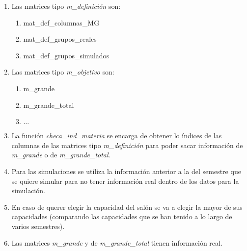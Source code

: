 \begin{enumerate}
  
  \item Las matrices tipo \textit{m\_definición} son:
  
  	\begin{enumerate}
  		\item mat\_def\_columnas\_MG
		
		\item mat\_def\_grupos\_reales
		
		\item mat\_def\_grupos\_simulados
	\end{enumerate}
  
  \item Las matrices tipo \textit{m\_objetivo} son:
  
  	\begin{enumerate}
  		\item m\_grande
		
		\item m\_grande\_total
		
		\item $\ldots$
	\end{enumerate}  
  
  
  \item La función \textit{checa\_ind\_materia} se encarga de obtener lo índices de las columnas de las matrices tipo \textit{m\_definición} para poder sacar información de \textit{m\_grande} o de \textit{m\_grande\_total}.
  
  \item Para las simulaciones se utiliza la información anterior a la del semestre que se quiere simular para no tener información real dentro  de los datos para la simulación.
  
  \item En caso de querer elegir la capacidad del salón se va a elegir la mayor de sus capacidades (comparando las capacidades que se han tenido a lo largo de varios semestres).
  
  \item Las matrices \textit{m\_grande} y de \textit{m\_grande\_total} tienen información real.
  

\end{enumerate}
